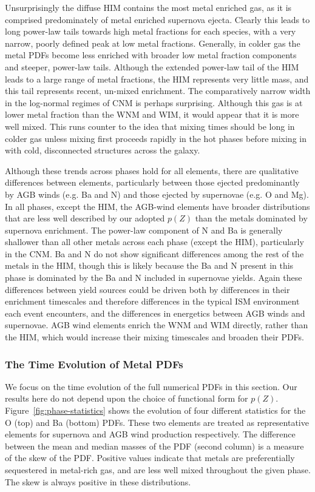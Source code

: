 \documentclass[twocolumn]{aastex61}
\begin{document}
Unsurprisingly the diffuse HIM contains the most metal enriched gas, as it is comprised predominately of metal enriched supernova ejecta. Clearly this leads to long power-law tails towards high metal fractions for each species, with a very narrow, poorly defined peak at low metal fractions. Generally, in colder gas the metal PDFs become less enriched with broader low metal fraction components and steeper, power-law tails. Although the extended power-law tail of the HIM leads to a large range of metal fractions, the HIM represents very little mass, and this tail represents recent, un-mixed enrichment. The comparatively narrow width in the log-normal regimes of CNM is perhaps surprising. Although this gas is at lower metal fraction than the WNM and WIM, it would appear that it is more well mixed. This runs counter to the idea that mixing times should be long in colder gas unless mixing first proceeds rapidly in the hot phases before mixing in with cold, disconnected structures across the galaxy.

Although these trends across phases hold for all elements, there are qualitative differences between elements, particularly between those ejected predominantly by AGB winds (e.g. Ba and N) and those ejected by supernovae (e.g. O and Mg). In all phases, except the HIM, the AGB-wind elements have broader distributions that are less well described by our adopted $p(Z)$ than the metals dominated by supernova enrichment. The power-law component of N and Ba is generally shallower than all other metals across each phase (except the HIM), particularly in the CNM. Ba and N do not show significant differences among the rest of the metals in the HIM, though this is likely because the Ba and N present in this phase is dominated by the Ba and N included in supernovae yields. Again these differences between yield sources could be driven both by differences in their enrichment timescales and therefore differences in the typical ISM environment each event encounters, and the differences in energetics between AGB winds and supernovae. AGB wind elements enrich the WNM and WIM directly, rather than the HIM, which would increase their mixing timescales and broaden their PDFs.

\subsubsection{The Time Evolution of Metal PDFs}
\label{sec:statistics}
We focus on the time evolution of the full numerical PDFs in this section. Our results here do not depend upon the choice of functional form for $p(Z)$. Figure~\ref{fig:phase-statistics} shows the evolution of four different statistics for the O (top) and Ba (bottom) PDFs. These two elements are treated as representative elements for supernova and AGB wind production respectively. The difference between the mean and median masses of the PDF (second column) is a measure of the skew of the PDF. Positive values indicate that metals are preferentially sequestered in metal-rich gas, and are less well mixed throughout the given phase. The skew is always positive in these distributions.
\end{document}
